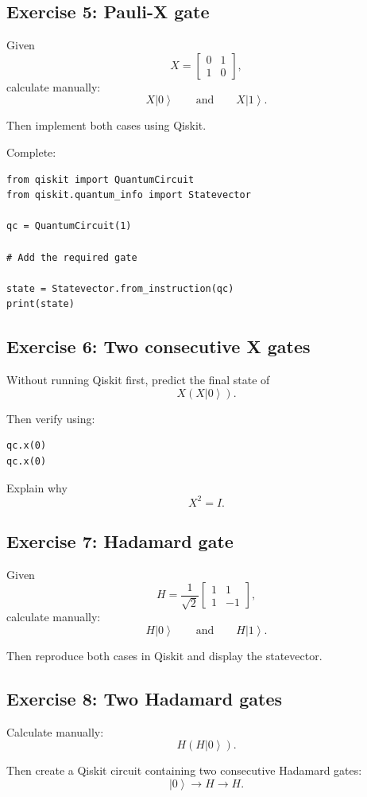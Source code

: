\documentclass[12pt,a4paper]{article}
\newcommand{\ket}[1]{\left|#1\right\rangle}
\begin{document}
\subsection*{Exercise 5: Pauli-X gate}
Given
\[
X=
\begin{bmatrix}
0&1\\
1&0
\end{bmatrix},
\]
calculate manually:
\[
X\ket{0}
\qquad\text{and}\qquad
X\ket{1}.
\]

Then implement both cases using Qiskit.

Complete:
\begin{lstlisting}
from qiskit import QuantumCircuit
from qiskit.quantum_info import Statevector

qc = QuantumCircuit(1)

# Add the required gate

state = Statevector.from_instruction(qc)
print(state)
\end{lstlisting}

\subsection*{Exercise 6: Two consecutive X gates}
Without running Qiskit first, predict the final state of
\[
X(X\ket{0}).
\]

Then verify using:
\begin{lstlisting}
qc.x(0)
qc.x(0)
\end{lstlisting}

Explain why
\[
X^2=I.
\]

\subsection*{Exercise 7: Hadamard gate}
Given
\[
H=
\frac{1}{\sqrt{2}}
\begin{bmatrix}
1&1\\
1&-1
\end{bmatrix},
\]
calculate manually:
\[
H\ket{0}
\qquad\text{and}\qquad
H\ket{1}.
\]

Then reproduce both cases in Qiskit and display the statevector.

\subsection*{Exercise 8: Two Hadamard gates}
Calculate manually:
\[
H(H\ket{0}).
\]

Then create a Qiskit circuit containing two consecutive Hadamard gates:
\[
\ket{0}\longrightarrow H\longrightarrow H.
\]
\end{document}
